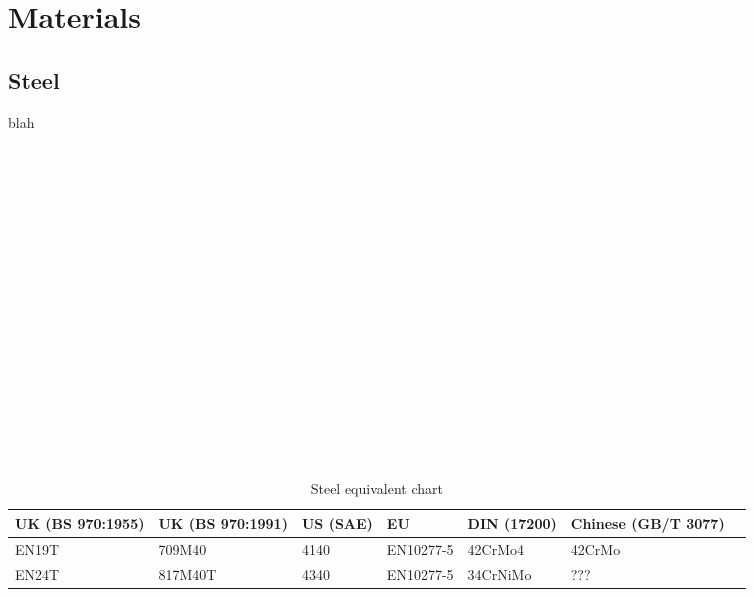 \chapter{Materials}
\section{Steel}
blah
\\ \\ \\ \\ \\ \\ \\ \\ \\ \\ \\ \\ \\ \\ \\ \\ \\ \\

\begin{table}[h!]
    \footnotesize
\begin{longtable}{l|l|l|l|l|l|l}
    UK (BS 970:1955)
    &UK (BS 970:1991)
    &US (SAE)
    &EU 
    &DIN (17200)
    &Chinese (GB/T 3077)
    \\
\hline
    EN19T & 709M40 & 4140 & EN10277-5 & 42CrMo4 & 42CrMo \\
    EN24T & 817M40T & 4340 & EN10277-5 & 34CrNiMo & ??? \\
\end{longtable}
    \caption{Steel equivalent chart}
\end{table}
